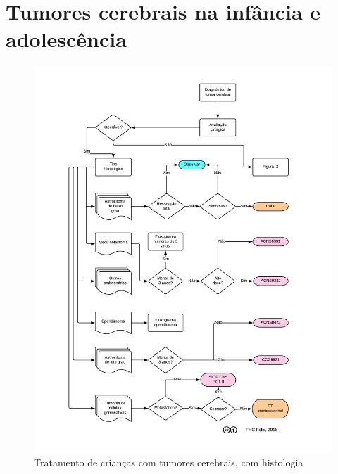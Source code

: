 \documentclass[11pt,a4paper,oldfontcommands]{memoir}
\begin{document}
\section{Tumores cerebrais na infância e adolescência}
\begin{center}
\begin{figure}[htpb]
\includegraphics[scale=0.8,trim = 10mm 10mm 8mm 5mm,clip]{fig/fig1.pdf}
\caption{Tratamento de crianças com tumores cerebrais, com histologia}
\end{figure}
\clearpage
\begin{figure}[!htb]

\end{figure}
\end{center}
\end{document}
